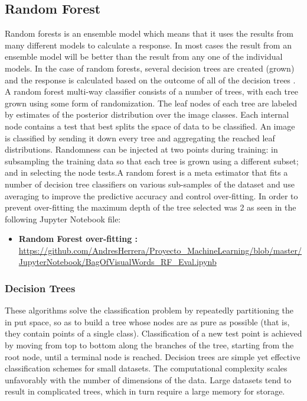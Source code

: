 \documentclass[12pt]{article}
\numberwithin{equation}{section}
\numberwithin{table}{section}
\numberwithin{figure}{section}
\begin{document}
\subsection{Random Forest} \label{randomf}

Random forests is an ensemble model which means that it uses the results from many different models to calculate a response. In most cases the result from an ensemble model will be better than the result from any one of the individual models. In the case of random forests, several decision trees are created (grown) and the response is calculated based on the outcome of all of the decision trees \cite{Horning2010}.   A random forest multi-way classifier consists of a number of trees, with each tree grown using some form of randomization. The leaf nodes of each tree are labeled by estimates of the posterior distribution over the image classes. Each internal node contains a test that best splits the space of data to be classified. An image is classified by sending it down every tree and aggregating the reached leaf distributions. Randomness can be injected at two points during training: in subsampling the training data so that each tree is grown using a different subset; and in selecting the node tests\cite{Bosch2007}.A random forest is a meta estimator that fits a number of decision tree classifiers on various sub-samples of the dataset and use averaging to improve the predictive accuracy and control over-fitting. In order to prevent over-fitting the maximum depth of the tree selected was 2 as seen in the following Jupyter Notebook file:

\begin{itemize}
	\item {\textbf{Random Forest over-fitting :} } \url{https://github.com/AndresHerrera/Proyecto_MachineLearning/blob/master/JupyterNotebook/BagOfVisualWords_RF_Eval.ipynb}
\end{itemize}

\subsubsection{Decision Trees} \label{dectree}
These algorithms solve the classification problem by repeatedly partitioning the in put space, so as to build a tree whose nodes are as pure as possible (that is, they contain points of a single class). Classification of a
new test point is achieved by moving from top to bottom along the branches of the tree, starting from the root node, until a terminal node is reached. Decision trees are simple yet effective classification schemes for small datasets. The computational complexity scales unfavorably with the number of dimensions of the data. Large datasets tend to result in complicated trees, which in turn require a large memory for storage. 
\end{document}
